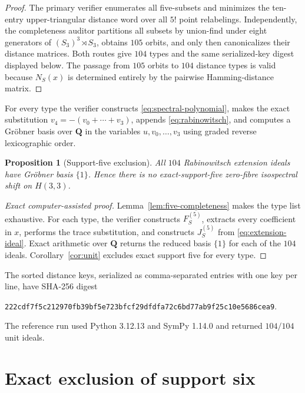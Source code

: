 \documentclass[11pt,reqno]{amsart}
\newtheorem{proposition}[theorem]{Proposition}
\theoremstyle{definition}
\theoremstyle{remark}
\newcommand{\Q}{\mathbf Q}
\begin{document}
\begin{proof}
The primary verifier enumerates all five-subsets and minimizes the ten-entry
upper-triangular distance word over all $5!$ point relabelings.  Independently,
the completeness auditor partitions all subsets by union-find under eight
generators of $(S_3)^3\rtimes S_3$, obtains $105$ orbits, and only then
canonicalizes their distance matrices.  Both routes give $104$ types and the
same serialized-key digest displayed below.  The passage from $105$ orbits
to $104$ distance types is valid because $N_S(x)$ is determined entirely by
the pairwise Hamming-distance matrix.
\end{proof}

For every type the verifier constructs \eqref{eq:spectral-polynomial}, makes
the exact substitution $v_4=-(v_0+\cdots+v_3)$, appends
\eqref{eq:rabinowitsch}, and computes a Gr\"obner basis over $\Q$ in the
variables $u,v_0,\ldots,v_3$ using graded reverse lexicographic order.

\begin{proposition}[Support-five exclusion]\label{prop:support5}
All $104$ Rabinowitsch extension ideals have Gr\"obner basis $\{1\}$.  Hence
there is no exact-support-five zero-fibre isospectral shift on $H(3,3)$.
\end{proposition}

\begin{proof}[Exact computer-assisted proof]
Lemma~\ref{lem:five-completeness} makes the type list exhaustive.  For each
type, the verifier constructs $F_S^{(5)}$, extracts every coefficient in
$x$, performs the trace substitution, and constructs $J_S^{(5)}$ from
\eqref{eq:extension-ideal}.  Exact arithmetic over $\Q$ returns the reduced
basis $\{1\}$ for each of the $104$ ideals.  Corollary~\ref{cor:unit} excludes
exact support five for every type.
\end{proof}

The sorted distance keys, serialized as comma-separated entries with one key
per line, have SHA-256 digest
\begin{center}
{\small\texttt{222cdf7f5c212970fb39bf5e723bfcf29dfdfa72c6bd77ab9f25c10e5686cea9}}.
\end{center}
The reference run used Python 3.12.13 and SymPy 1.14.0 and returned
$104/104$ unit ideals.

\section{Exact exclusion of support six}\label{sec:support-six}
\end{document}
